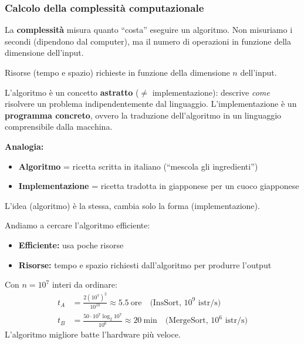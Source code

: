 \newpage
\subsubsection*{Calcolo della complessità computazionale}

\begin{softnote}
	La \textbf{complessità} misura quanto ``costa'' eseguire un algoritmo. Non misuriamo i secondi (dipendono dal computer), ma il numero di operazioni in funzione della dimensione dell'input.
\end{softnote}

\begin{definizione}[Efficienza]
	Risorse (tempo e spazio) richieste in funzione della dimensione $n$ dell'input.
\end{definizione}

\begin{definizione}
	L'algoritmo è un concetto \textbf{astratto} ($\neq$ implementazione):
	descrive \textit{come} risolvere un problema indipendentemente dal linguaggio.
	L'implementazione è un \textbf{programma concreto}, ovvero la traduzione
	dell'algoritmo in un linguaggio comprensibile dalla macchina.
\end{definizione}

\begin{nota}
	\textbf{Analogia:}
	\begin{itemize}
		\item \textbf{Algoritmo} = ricetta scritta in italiano (``mescola gli ingredienti'')
		\item \textbf{Implementazione} = ricetta tradotta in giapponese per un cuoco giapponese
	\end{itemize}
	L'idea (algoritmo) è la stessa, cambia solo la forma (implementazione).
\end{nota}

\begin{nozione}
	Andiamo a cercare l'algoritmo efficiente:
	\begin{itemize}
		\item \textbf{Efficiente:} usa poche risorse
		\item \textbf{Risorse:} tempo e spazio richiesti dall'algoritmo
		per produrre l'output
	\end{itemize}
\end{nozione}

\begin{teorema}
	Con $n = 10^7$ interi da ordinare:
	\begin{align*}
		t_A &= \frac{2(10^7)^2}{10^{10}} \approx 5.5\ \text{ore}
		\quad\text{(InsSort, } 10^9 \text{ istr/s)} \\
		t_B &= \frac{50 \cdot 10^7 \log_2 10^7}{10^6} \approx 20\ \text{min}
		\quad\text{(MergeSort, } 10^6 \text{ istr/s)}
	\end{align*}
	L'algoritmo migliore batte l'hardware più veloce.
\end{teorema}

